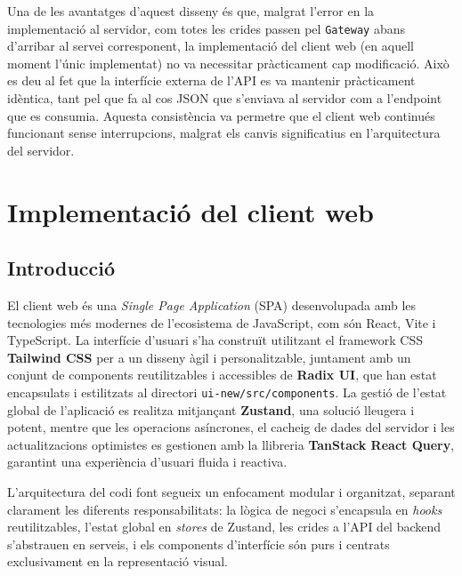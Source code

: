 Una de les avantatges d'aquest disseny és que, malgrat l'error en la implementació al servidor, com totes les crides passen pel \texttt{Gateway} abans d'arribar al servei corresponent, la implementació del client web (en aquell moment l'únic implementat) no va necessitar pràcticament cap modificació. Això es deu al fet que la interfície externa de l'API es va mantenir pràcticament idèntica, tant pel que fa al cos JSON que s'enviava al servidor com a l'endpoint que es consumia. Aquesta consistència va permetre que el client web continués funcionant sense interrupcions, malgrat els canvis significatius en l'arquitectura del servidor.

\section{Implementació del client web}

\subsection{Introducció}
El client web és una \textit{Single Page Application} (SPA) desenvolupada amb les tecnologies més modernes de l'ecosistema de JavaScript, com són React, Vite i TypeScript. La interfície d'usuari s'ha construït utilitzant el framework CSS \textbf{Tailwind CSS} per a un disseny àgil i personalitzable, juntament amb un conjunt de components reutilitzables i accessibles de \textbf{Radix UI}, que han estat encapsulats i estilitzats al directori \texttt{ui-new/src/components}. La gestió de l'estat global de l'aplicació es realitza mitjançant \textbf{Zustand}, una solució lleugera i potent, mentre que les operacions asíncrones, el cacheig de dades del servidor i les actualitzacions optimistes es gestionen amb la llibreria \textbf{TanStack React Query}, garantint una experiència d'usuari fluida i reactiva.

L'arquitectura del codi font segueix un enfocament modular i organitzat, separant clarament les diferents responsabilitats: la lògica de negoci s'encapsula en \textit{hooks} reutilitzables, l'estat global en \textit{stores} de Zustand, les crides a l'API del backend s'abstrauen en serveis, i els components d'interfície són purs i centrats exclusivament en la representació visual.

